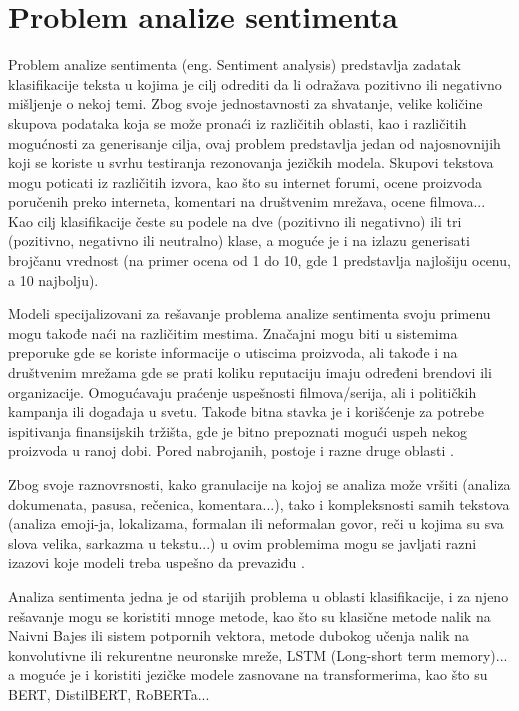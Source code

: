 \documentclass[12pt,oneside]{memoir}
\begin{document}
\section{Problem analize sentimenta}

Problem analize sentimenta (eng. Sentiment analysis) predstavlja zadatak klasifikacije teksta u kojima je cilj odrediti da li odražava pozitivno ili negativno mišljenje o nekoj temi. Zbog svoje jednostavnosti za shvatanje, velike količine skupova podataka koja se može pronaći iz različitih oblasti, kao i različitih mogućnosti za generisanje cilja, ovaj problem predstavlja jedan od najosnovnijih koji se koriste u svrhu testiranja rezonovanja jezičkih modela. Skupovi tekstova mogu poticati iz različitih izvora, kao što su internet forumi, ocene proizvoda poručenih preko interneta, komentari na društvenim mrežava, ocene filmova... Kao cilj klasifikacije česte su podele na dve (pozitivno ili negativno) ili  tri (pozitivno, negativno ili neutralno) klase, a moguće je i na izlazu generisati brojčanu vrednost (na primer ocena od 1 do 10, gde 1 predstavlja najlošiju ocenu, a 10 najbolju).

Modeli specijalizovani za rešavanje problema analize sentimenta svoju primenu mogu takođe naći na različitim mestima. Značajni mogu biti u sistemima preporuke gde se koriste informacije o utiscima  proizvoda, ali takođe i na društvenim mrežama gde se prati koliku reputaciju imaju određeni brendovi ili organizacije. Omogućavaju praćenje uspešnosti filmova/serija, ali i političkih kampanja ili događaja u svetu. Takođe bitna stavka je i korišćenje za potrebe ispitivanja finansijskih tržišta, gde je bitno prepoznati mogući uspeh nekog proizvoda u ranoj dobi. Pored nabrojanih, postoje i razne druge oblasti \cite{SentimentAnalysisApplication}.

Zbog svoje raznovrsnosti, kako granulacije na kojoj se analiza može vršiti (analiza dokumenata, pasusa, rečenica, komentara...)\cite{SentimentAnalysisGranularity}, tako i kompleksnosti samih tekstova (analiza emoji-ja, lokalizama, formalan ili neformalan govor, reči u kojima su sva slova velika, sarkazma u tekstu...) u ovim problemima mogu se javljati razni izazovi koje modeli treba uspešno da prevaziđu \cite{SentimentAnalysisChallenges}.

Analiza sentimenta jedna je od starijih problema u oblasti klasifikacije, i za njeno rešavanje mogu se koristiti mnoge metode, kao što su klasične metode nalik na Naivni Bajes\cite{SANaiveBayes} ili sistem potpornih vektora\cite{SASVM}, metode dubokog učenja nalik na konvolutivne\cite{SAConvolutional} ili rekurentne neuronske mreže\cite{SARecurrent}, LSTM (Long-short term memory)\cite{SALSTM}... a moguće je i koristiti jezičke modele zasnovane na transformerima, kao što su BERT, DistilBERT, RoBERTa...
\end{document}
